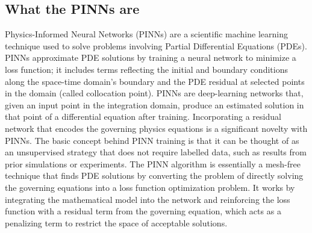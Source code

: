 \documentclass[pdflatex,sn-basic]{sn-jnl}%
\theoremstyle{thmstyleone}%
\theoremstyle{thmstyletwo}%
\theoremstyle{thmstylethree}%
\begin{document}
\subsection{What the PINNs are} 
%
Physics-Informed Neural Networks (PINNs) are a scientific machine learning technique used to solve problems involving Partial Differential Equations (PDEs).
PINNs approximate PDE solutions by training a neural network to minimize a loss function; it includes terms reflecting the initial and boundary conditions along the space-time domain's boundary and the PDE residual at selected points in the domain (called collocation point). 
PINNs are deep-learning networks that, given an input point in the integration domain, produce an estimated solution in that point of a differential equation after training.
%
Incorporating a residual network that encodes the governing physics equations is a significant novelty with PINNs.
The basic concept behind PINN training is that it can be thought of as an unsupervised strategy that does not require labelled data, such as results from prior simulations or experiments.
%
The PINN algorithm is essentially a mesh-free technique that finds PDE solutions by converting the problem of directly solving the governing equations into a loss function optimization problem.
It works by integrating the mathematical model into the network and reinforcing the loss function with a residual term from the governing equation, which acts as a penalizing term to restrict the space of acceptable solutions.



\end{document}
